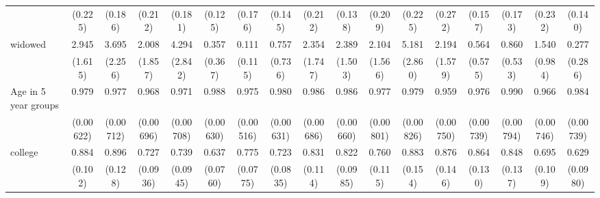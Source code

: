 {\begin{tabular}{l*{16}{c}}
                    &     (0.225)         &     (0.186)         &     (0.212)         &     (0.181)         &     (0.125)         &     (0.176)         &     (0.145)         &     (0.212)         &     (0.138)         &     (0.209)         &     (0.225)         &     (0.272)         &     (0.157)         &     (0.173)         &     (0.232)         &     (0.140)         \\
[1em]
widowed             &       2.945\sym{*}  &       3.695\sym{*}  &       2.008         &       4.294\sym{*}  &       0.357         &       0.111\sym{*}  &       0.757         &       2.354         &       2.389         &       2.104         &       5.181\sym{**} &       2.194         &       0.564         &       0.860         &       1.540         &       0.277         \\
                    &     (1.615)         &     (2.256)         &     (1.857)         &     (2.842)         &     (0.367)         &     (0.115)         &     (0.736)         &     (1.747)         &     (1.503)         &     (1.566)         &     (2.860)         &     (1.579)         &     (0.575)         &     (0.533)         &     (0.984)         &     (0.286)         \\
[1em]
Age in 5 year groups&       0.979\sym{***}&       0.977\sym{**} &       0.968\sym{***}&       0.971\sym{***}&       0.988         &       0.975\sym{***}&       0.980\sym{**} &       0.986\sym{*}  &       0.986\sym{*}  &       0.977\sym{**} &       0.979\sym{*}  &       0.959\sym{***}&       0.976\sym{**} &       0.990         &       0.966\sym{***}&       0.984\sym{*}  \\
                    &   (0.00622)         &   (0.00712)         &   (0.00696)         &   (0.00708)         &   (0.00630)         &   (0.00516)         &   (0.00631)         &   (0.00686)         &   (0.00660)         &   (0.00801)         &   (0.00826)         &   (0.00750)         &   (0.00739)         &   (0.00794)         &   (0.00746)         &   (0.00739)         \\
[1em]
college             &       0.884         &       0.896         &       0.727\sym{*}  &       0.739\sym{*}  &       0.637\sym{***}&       0.775\sym{*}  &       0.723\sym{**} &       0.831         &       0.822         &       0.760         &       0.883         &       0.876         &       0.864         &       0.848         &       0.695\sym{*}  &       0.629\sym{**} \\
                    &     (0.102)         &     (0.128)         &    (0.0936)         &    (0.0945)         &    (0.0760)         &    (0.0775)         &    (0.0835)         &     (0.114)         &    (0.0985)         &     (0.115)         &     (0.154)         &     (0.146)         &     (0.130)         &     (0.137)         &     (0.109)         &    (0.0980)         \\

\end{tabular}}
